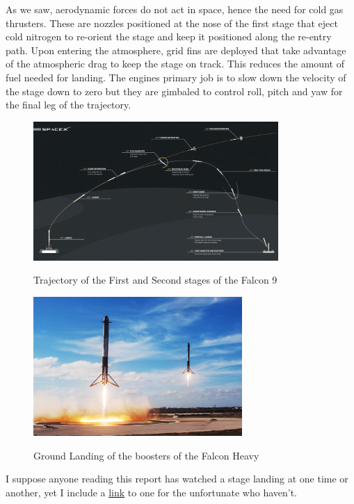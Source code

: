 \documentclass[12pt, letterpaper]{article}
\begin{document}
As we saw, aerodynamic forces do not act in space, hence the need for cold gas thrusters. These are nozzles positioned at the nose of the first stage that eject cold nitrogen to re-orient the stage and keep it positioned along the re-entry path. Upon entering the atmosphere, grid fins are deployed that take advantage of the atmospheric drag to keep the stage on track. This reduces the amount of fuel needed for landing. The engines primary job is to slow down the velocity of the stage down to zero but they are gimbaled to control roll, pitch and yaw for the final leg of the trajectory.

\begin{figure}[H]
	\centering
    \includegraphics[height=200px]{Falcon_9_First_Stage_Reusability_Graphic}
    \label{fig:Falcon_9_First_Stage_Reusability_Graphic}
    \caption{Trajectory of the First and Second stages of the Falcon 9}
\end{figure}

\begin{figure}[H]
	\centering
    \includegraphics[height=200px]{spacexrocketreturn}
    \label{fig:spacexrocketreturn}
    \caption{Ground Landing of the boosters of the Falcon Heavy}
\end{figure}

I suppose anyone reading this report has watched a stage landing at one time or another, yet I include a \href{https://www.youtube.com/watch?v=sf4qRY3h_eo}{link} to one for the unfortunate who haven't. 
\end{document}
